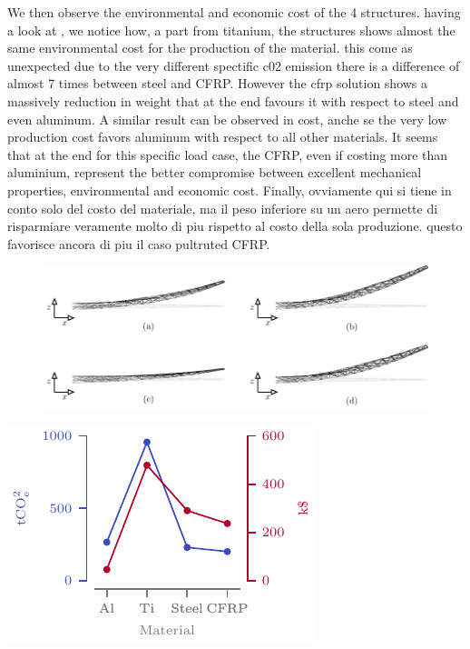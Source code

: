 We then observe the environmental and economic cost of the 4 structures. having a look at , we notice how, a part from titanium, the structures shows almost the same environmental cost for the production of the material. this come as unexpected due to the very different spectific c02 emission \eg there is a difference of almost 7 times between steel and CFRP. However the cfrp solution shows a massively reduction in weight that at the end favours it with respect to steel and even aluminum. A similar result can be observed in cost, anche se the very low production cost favors aluminum with respect to all other materials. It seems that at the end for this specific load case, the CFRP, even if costing more than aluminium, represent the better compromise between excellent mechanical properties, environmental and economic cost. Finally, ovviamente qui si tiene in conto solo del costo del materiale, ma il peso inferiore su un aero permette di risparmiare veramente molto di piu rispetto al costo della sola produzione. questo favorisce ancora di piu il caso pultruted CFRP.

\begin{figure}
    \centering
    \includegraphics[width=\linewidth]{figures/07_aeronautic/00_materials/mat.pdf}
     \caption{}
    \label{fig:07_mat_sol}
\end{figure}

\begin{marginfigure}
    \centering
    \includegraphics[width=\linewidth]{figures/07_aeronautic/00_co2eq/co2_dollar.pdf}
    \caption{}
    \label{fig:07_cost}
\end{marginfigure}


